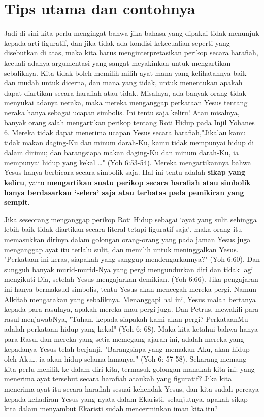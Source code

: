 \section*{Tips utama dan contohnya}
Jadi di sini kita perlu mengingat bahwa jika bahasa yang dipakai tidak menunjuk kepada arti figuratif, dan jika tidak ada kondisi kekecualian seperti yang disebutkan di atas, maka kita harus menginterpretasikan perikop secara harafiah, kecuali adanya argumentasi yang sangat meyakinkan untuk mengartikan sebaliknya. Kita tidak boleh memilih-milih ayat mana yang kelihatannya baik dan mudah untuk dicerna, dan mana yang tidak, untuk menentukan apakah dapat diartikan secara harafiah atau tidak. Misalnya, ada banyak orang tidak menyukai adanya neraka, maka mereka menganggap perkataan Yesus tentang neraka hanya sebagai ucapan simbolis. Ini tentu saja keliru! Atau misalnya, banyak orang salah mengartikan perikop tentang Roti Hidup pada Injil Yohanes 6. Mereka tidak dapat menerima ucapan Yesus secara harafiah,"Jikalau kamu tidak makan daging-Ku dan minum darah-Ku, kamu tidak mempunyai hidup di dalam dirimu; dan barangsiapa makan daging-Ku dan minum darah-Ku, ia mempunyai hidup yang kekal …" (Yoh 6:53-54). Mereka mengartikannya bahwa Yesus hanya berbicara secara simbolik saja. Hal ini tentu adalah \textbf{sikap yang keliru}, yaitu \textbf{mengartikan suatu perikop secara harafiah atau simbolik hanya berdasarkan ‘selera’ saja atau terbatas pada pemikiran yang sempit}.

Jika seseorang menganggap perikop Roti Hidup sebagai ‘ayat yang sulit sehingga lebih baik tidak diartikan secara literal tetapi figuratif saja’, maka orang itu memasukkan dirinya dalam golongan orang-orang yang pada jaman Yesus juga menganggap ayat itu terlalu sulit, dan memilih untuk meninggalkan Yesus. "Perkataan ini keras, siapakah yang sanggup mendengarkannya?" (Yoh 6:60). Dan sungguh banyak murid-murid-Nya yang pergi mengundurkan diri dan tidak lagi mengikuti Dia, setelah Yesus mengajarkan demikian. (Yoh 6:66). Jika pengajaran ini hanya bermaksud simbolis, tentu Yesus akan mencegah mereka pergi. Namun Alkitab mengatakan yang sebaliknya. Menanggapi hal ini, Yesus malah bertanya kepada para rasulnya, apakah mereka mau pergi juga. Dan Petrus, mewakili para rasul menjawabNya, "Tuhan, kepada siapakah kami akan pergi? PerkataanMu adalah perkataan hidup yang kekal" (Yoh 6: 68). Maka kita ketahui bahwa hanya para Rasul dan mereka yang setia memegang ajaran ini, adalah mereka yang kepadanya Yesus telah berjanji, "Barangsiapa yang memakan Aku, akan hidup oleh Aku… ia akan hidup selama-lamanya." (Yoh 6: 57-58). Sekarang memang kita perlu menilik ke dalam diri kita, termasuk golongan manakah kita ini: yang menerima ayat tersebut secara harafiah ataukah yang figuratif? Jika kita menerima ayat itu secara harafiah sesuai kehendak Yesus, dan kita sudah percaya kepada kehadiran Yesus yang nyata dalam Ekaristi, selanjutnya, apakah sikap kita dalam menyambut Ekaristi sudah mencerminkan iman kita itu?


